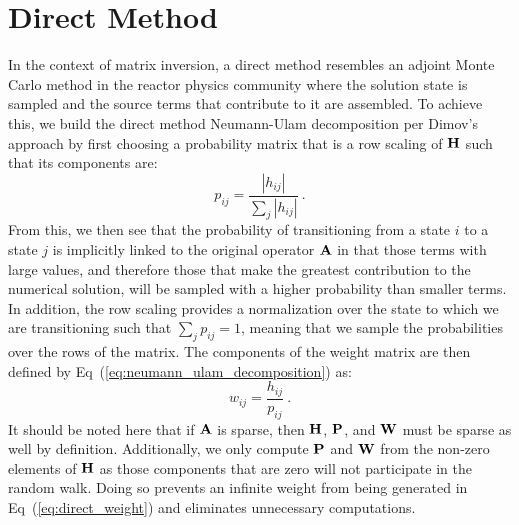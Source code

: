 \section{Direct Method}
\label{sec:direct_mc}
In the context of matrix inversion, a direct method resembles an
adjoint Monte Carlo method in the reactor physics community where the
solution state is sampled and the source terms that contribute to it
are assembled. To achieve this, we build the direct method
Neumann-Ulam decomposition per Dimov's approach by first choosing a
probability matrix that is a row scaling of $\mathbf{H}$ such that its
components are:
\begin{equation}
  p_{ij} = \frac{|h_{ij}|}{\sum_j |h_{ij}|}\:.
  \label{eq:direct_probability}
\end{equation}
From this, we then see that the probability of transitioning from a
state $i$ to a state $j$ is implicitly linked to the original operator
$\mathbf{A}$ in that those terms with large values, and therefore those
that make the greatest contribution to the numerical solution, will be
sampled with a higher probability than smaller terms. In addition, the
row scaling provides a normalization over the state to which we are
transitioning such that $\sum_j p_{ij} = 1$, meaning that we sample
the probabilities over the rows of the matrix. The components of
the weight matrix are then defined by
Eq~(\ref{eq:neumann_ulam_decomposition}) as:
\begin{equation}
  w_{ij} = \frac{h_{ij}}{p_{ij}}\:.
  \label{eq:direct_weight}
\end{equation}
It should be noted here that if $\mathbf{A}$ is sparse, then $\mathbf{H}$,
$\mathbf{P}$, and $\mathbf{W}$ must be sparse as well by
definition. Additionally, we only compute $\mathbf{P}$ and $\mathbf{W}$ from
the non-zero elements of $\mathbf{H}$ as those components that are zero
will not participate in the random walk. Doing so prevents an
infinite weight from being generated in Eq~(\ref{eq:direct_weight})
and eliminates unnecessary computations.

